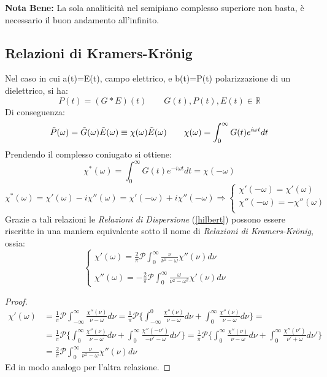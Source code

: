 \documentclass[twoside]{article}
\begin{document}
\textbf{Nota Bene:} La sola analiticità nel semipiano complesso superiore non basta, è necessario il buon andamento all'infinito.

\subsection{Relazioni di Kramers-Kr\"onig}
Nel caso in cui a(t)=E(t), campo elettrico, e b(t)=P(t) polarizzazione di un dielettrico, si ha:
\begin{equation}
    P(t)=(G*E)(t) \qquad G(t),P(t),E(t)\in \mathds{R}
\end{equation}
Di conseguenza:
\begin{equation}
    \Tilde{P}(\omega)=\Tilde{G}(\omega)\Tilde{E}(\omega)\equiv \chi(\omega)\Tilde{E}(\omega) \qquad \chi(\omega)=\int_0^\infty G(t)e^{i\omega t}dt
\end{equation}
Prendendo il complesso coniugato si ottiene:
\begin{equation}
    \chi^*(\omega)=\int_0^\infty G(t)e^{-i\omega t}dt=\chi(-\omega)
\end{equation}
\begin{equation}
     \chi^*(\omega)=\chi'(\omega)-i\chi''(\omega)=\chi'(-\omega)+i\chi''(-\omega) \Longrightarrow \begin{cases}
     \chi'(-\omega)=\chi'(\omega)\\
     \chi''(-\omega)=-\chi''(\omega)\\
     \end{cases}
\end{equation}
Grazie a tali relazioni le \textit{Relazioni di Dispersione} (\ref{hilbert}) possono essere riscritte in una maniera equivalente sotto il nome di \textit{Relazioni di Kramers-Kr\"onig}, ossia:
\begin{equation}
    \left\{ \begin{array}{lr}
         \chi'(\omega)=\frac{2}{\pi}\mathscr{P}\int_0^\infty \frac{\nu}{\nu^2 - \omega}\chi''(\nu)d\nu \\
         & \\
         \chi''(\omega)=-\frac{2}{\pi}\mathscr{P}\int_0^\infty \frac{\omega}{\nu^2 - \omega^2}\chi'(\nu)d\nu
    \end{array} \right.
\end{equation}
\begin{proof}
\begin{align}
    \chi'(\omega)&=\frac{1}{\pi}\mathscr{P}\int_{-\infty}^{\infty}\frac{\chi''(\nu)}{\nu -\omega}d\nu=\frac{1}{\pi}\mathscr{P}\biggl\{\int_{-\infty}^{0}\frac{\chi''(\nu)}{\nu -\omega}d\nu+\int_{0}^{\infty}\frac{\chi''(\nu)}{\nu -\omega}d\nu\biggr\}=\\
    &=\frac{1}{\pi}\mathscr{P}\biggl\{\int_{0}^{\infty}\frac{\chi''(\nu)}{\nu -\omega}d\nu+\int_{0}^{\infty}\frac{\chi''(-\nu')}{-\nu' -\omega}d\nu'\biggr\}=\frac{1}{\pi}\mathscr{P}\biggl\{\int_{0}^{\infty}\frac{\chi''(\nu)}{\nu -\omega}d\nu+\int_{0}^{\infty}\frac{\chi''(\nu')}{\nu'+\omega}d\nu'\biggr\}\\
    &=\frac{2}{\pi}\mathscr{P}\int_0^\infty \frac{\nu}{\nu^2 - \omega}\chi''(\nu)d\nu 
\end{align}
Ed in modo analogo per l'altra relazione.
\end{proof}
\end{document}
